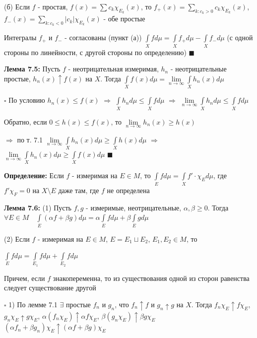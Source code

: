 \documentclass[a4paper]{report}
\begin{document}
(б) Если $f$ - простая, $f(x)=\sum c_k\chi_{E_k}(x)$, то $f_+(x)=\sum\limits_{k\colon c_k>0} c_k\chi_{E_k}(x)$, $f_-(x)=\sum\limits_{k\colon c_k<0}|c_k|\chi_{E_k}(x)$ - обе простые

Интегралы $f_+$ и $f_-$ - согласованы (пункт (а)) $\displaystyle\int\limits_X fd\mu=\displaystyle\int\limits_X f_+d\mu-\displaystyle\int\limits_X f_-d\mu$ (с одной стороны по линейности, с другой стороны по определению) $\blacksquare$
\bigskip

\noindent\textbf{Лемма 7.5:} Пусть $f$ - неотрицательная измеримая, $h_n$ - неотрицательные простые, $h_n(x)\uparrow f(x)$ на $X$. Тогда $\displaystyle\int\limits_X f(x)d\mu=\lim\limits_{n\to\infty}\displaystyle\int\limits_X h_n(x)d\mu$

\noindent $\square$ По условию $h_n(x)\le f(x)$ $\Rightarrow$ $\displaystyle\int\limits_Xh_nd\mu\le\displaystyle\int\limits_X fd\mu$ $\Rightarrow$ $\lim\limits_{n\to\infty}\displaystyle\int\limits_X h_n
d\mu\le\displaystyle\int\limits_Xfd\mu$

Обратно, если $0\le h(x)\le f(x)$, то $\lim\limits_{n\to\infty} h_n(x)\ge h(x)$ 

$\Rightarrow$ по т. 7.1 $\lim\limits_{n\to\infty}\displaystyle\int\limits_X h_n(x)d\mu\ge\displaystyle\int\limits_X h(x) d\mu$ $\Rightarrow$ $\lim\limits_{n\to\infty}\displaystyle\int\limits_X h_n(x) d\mu
\ge\displaystyle\int\limits_X f(x) d\mu$ $\blacksquare$
\bigskip

\noindent\textbf{Определение:} Если $f$ - измеримая на $E\in M$, то $\displaystyle\int\limits_E fd\mu=\displaystyle\int\limits_X f'\cdot\chi_Ed\mu$, где $f'\chi_F=0$ на $X\setminus E$ даже там, где $f$ не определена
\bigskip

\noindent\textbf{Лемма 7.6:} (1) Пусть $f,g$ - измеримые, неотрицательные, $\alpha,\beta\ge0$. Тогда $\forall E\in M\quad\displaystyle\int\limits_E(\alpha f+\beta g)d\mu=\alpha
\displaystyle\int\limits_E fd\mu+\beta\displaystyle\int\limits_E gd\mu$

(2) Если $f$ - измеримая на $E\in M$, $E=E_1\sqcup E_2$, $E_1,E_2\in M$, то 

$\displaystyle\int\limits_E fd\mu=\displaystyle\int\limits_{E_1}fd\mu+\displaystyle\int\limits_{E_2}fd\mu$

 Причем, если $f$ знакопеременна, то из существования одной из сторон равенства следует существование другой

\noindent $\square$ 1) По лемме 7.1 $\exists$ простые $f_n$ и $g_n$, что $f_n\uparrow f$ и $g_n\uparrow g$ на $X$. Тогда $f_n\chi_E\uparrow f\chi_E$, $g_n\chi_E
\uparrow g\chi_E$, $\alpha(f_n\chi_E)\uparrow\alpha f\chi_E$, $\beta(g_n\chi_E)\uparrow\beta g\chi_E$ $(\alpha f_n+\beta g_n)\chi_E\uparrow(\alpha f+\beta g)\chi_E$
\end{document}
